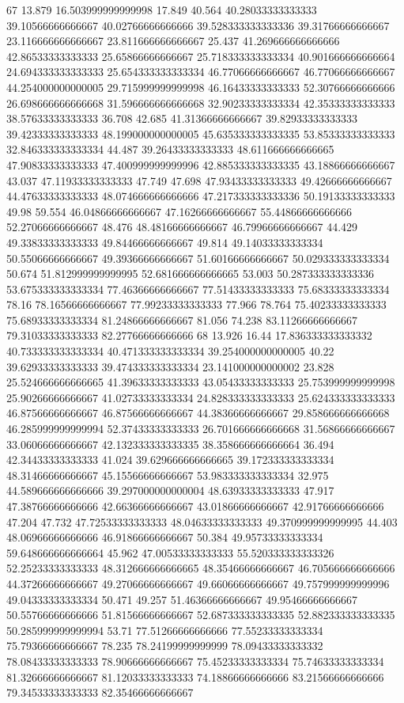 67 13.879 16.503999999999998 17.849 40.564 40.28033333333333 39.10566666666667 40.02766666666666 39.528333333333336 39.31766666666667 23.116666666666667 23.811666666666667 25.437 41.269666666666666 42.86533333333333 25.65866666666667 25.718333333333334 40.901666666666664 24.694333333333333 25.654333333333334 46.77066666666667 46.77066666666667 44.254000000000005 29.715999999999998 46.16433333333333 52.30766666666666 26.698666666666668 31.596666666666668 32.90233333333334 42.35333333333333 38.57633333333333 36.708 42.685 41.31366666666667 39.82933333333333 39.42333333333333 48.199000000000005 45.635333333333335 53.85333333333333 32.846333333333334 44.487 39.26433333333333 48.611666666666665 47.90833333333333 47.400999999999996 42.885333333333335 43.18866666666667 43.037 47.11933333333333 47.749 47.698 47.93433333333333 49.42666666666667 44.47633333333333 48.074666666666666 47.217333333333336 50.19133333333333 49.98 59.554 46.04866666666667 47.16266666666667 55.44866666666666 52.27066666666667 48.476 48.48166666666667 46.79966666666667 44.429 49.33833333333333 49.84466666666667 49.814 49.14033333333334 50.55066666666667 49.39366666666667 51.60166666666667 50.029333333333334 50.674 51.812999999999995 52.681666666666665 53.003 50.287333333333336 53.675333333333334 77.46366666666667 77.51433333333333 75.68333333333334 78.16 78.16566666666667 77.99233333333333 77.966 78.764 75.40233333333333 75.68933333333334 81.24866666666667 81.056 74.238 83.11266666666667 79.31033333333333 82.27766666666666
68 13.926 16.44 17.836333333333332 40.733333333333334 40.471333333333334 39.254000000000005 40.22 39.62933333333333 39.474333333333334 23.141000000000002 23.828 25.524666666666665 41.39633333333333 43.05433333333333 25.753999999999998 25.90266666666667 41.02733333333334 24.828333333333333 25.624333333333333 46.87566666666667 46.87566666666667 44.38366666666667 29.858666666666668 46.285999999999994 52.37433333333333 26.701666666666668 31.56866666666667 33.06066666666667 42.132333333333335 38.358666666666664 36.494 42.34433333333333 41.024 39.629666666666665 39.172333333333334 48.31466666666667 45.15566666666667 53.983333333333334 32.975 44.589666666666666 39.297000000000004 48.63933333333333 47.917 47.38766666666666 42.66366666666667 43.01866666666667 42.91766666666666 47.204 47.732 47.72533333333333 48.04633333333333 49.370999999999995 44.403 48.06966666666666 46.91866666666667 50.384 49.95733333333334 59.648666666666664 45.962 47.00533333333333 55.520333333333326 52.25233333333333 48.312666666666665 48.35466666666667 46.705666666666666 44.37266666666667 49.27066666666667 49.66066666666667 49.757999999999996 49.04333333333334 50.471 49.257 51.46366666666667 49.95466666666667 50.55766666666666 51.81566666666667 52.687333333333335 52.882333333333335 50.285999999999994 53.71 77.51266666666666 77.55233333333334 75.79366666666667 78.235 78.24199999999999 78.09433333333332 78.08433333333333 78.90666666666667 75.45233333333334 75.74633333333334 81.32666666666667 81.12033333333333 74.18866666666666 83.21566666666666 79.34533333333333 82.35466666666667
